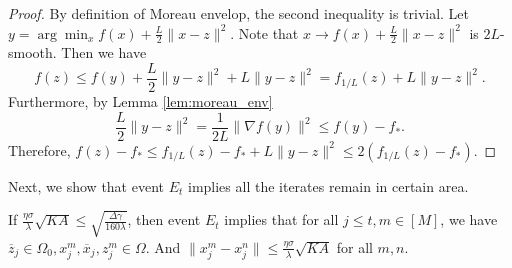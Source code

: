 \documentclass{article} %
\numberwithin{equation}{section}
\begin{document}
\begin{proof}
    By definition of Moreau envelop, the second inequality is trivial.
    Let $y=\arg\min_x f(x)+\frac{L}{2}\|x-z\|^2$.
    Note that $x\to f(x)+\frac{L}{2}\|x-z\|^2$ is $2L$-smooth.
    Then we have
    \begin{equation}
        f(z) \leq f(y) + \frac{L}{2} \|y-z\|^2 + L \|y-z\|^2 = f_{1/L}(z) + L \|y-z\|^2.
    \end{equation}
    Furthermore, by Lemma \ref{lem:moreau_env} 
    \begin{equation}
        \frac{L}{2}\|y-z\|^2 = \frac{1}{2L} \|\nabla f(y)\|^2\leq f(y)-f_*. 
    \end{equation}
    Therefore, $f(z)-f_*\leq f_{1/L}(z)-f_* + L\|y-z\|^2 \leq 2(f_{1/L}(z)-f_*)$.
\end{proof}

    Next, we show that event $E_t$ implies all the iterates remain in certain area.

\begin{lemma}\label{lem:in_ball}
    If $\frac{\eta\sigma}{\lambda}\sqrt{KA}\leq \sqrt{\frac{\Delta\gamma}{160\lambda}}$, then event $E_t$ implies that for all $j\leq t, m\in[M]$, we have $\overline{z}_j\in\Omega_0, x_j^m, \overline{x}_j, z_j^m\in \Omega$. And $\|x_j^m-x_j^n\| \leq \frac{\eta\sigma}{\lambda}\sqrt{KA}$ for all $m,n$.
\end{lemma}
\end{document}
